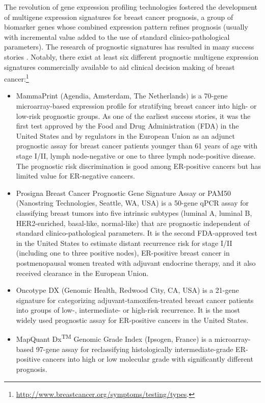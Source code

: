 The revolution of gene expression profiling technologies fostered the development of multigene expression signatures for breast cancer prognosis, a group of biomarker genes whose combined expression pattern refines prognosis (usually with incremental value added to the use of standard clinico-pathological parameters). The research of prognostic signatures has resulted in many success stories \cite{Sotiriou2009Gene}. Notably, there exist at least six different prognostic multigene expression signatures commercially available to aid clinical decision making of breast cancer:\footnote{\url{http://www.breastcancer.org/symptoms/testing/types}.}
\begin{itemize}
	\item MammaPrint\textsuperscript{\textregistered} (Agendia, Amsterdam, The Netherlands) \cite{Veer2002Gene} is a 70-gene microarray-based expression profile for stratifying breast cancer into high- or low-risk prognostic groups. As one of the earliest success stories, it was the first test approved by the Food and Drug Administration (FDA) in the United States and by regulators in the European Union as an adjunct prognostic assay for breast cancer patients younger than 61 years of age with stage I/II, lymph node-negative or one to three lymph node-positive disease. The prognostic risk discrimination is good among ER-positive cancers but has limited value for ER-negative cancers.
	\item Prosigna\textsuperscript{\textregistered} Breast Cancer Prognostic Gene Signature Assay or PAM50 (Nanostring Technologies, Seattle, WA, USA) \cite{Parker2009Supervised} is a 50-gene qPCR assay for classifying breast tumors into five intrinsic subtypes (luminal A, luminal B, HER2-enriched, basal-like, normal-like) that are prognostic independent of standard clinico-pathological parameters. It is the second FDA-approved test in the United States to estimate distant recurrence risk for stage I/II (including one to three positive nodes), ER-positive breast cancer in postmenopausal women treated with adjuvant endocrine therapy, and it also received clearance in the European Union.
	\item Oncotype DX\textsuperscript{\textregistered} (Genomic Health, Redwood City, CA, USA) \cite{Paik2004multigene} is a 21-gene signature for categorizing adjuvant-tamoxifen-treated breast cancer patients into groups of low-, intermediate- or high-risk recurrence. It is the most widely used prognostic assay for ER-positive cancers in the United States.
	\item MapQuant Dx\textsuperscript{TM} Genomic Grade Index (Ipsogen, France) \cite{Sotiriou2006Gene} is a microarray-based 97-gene assay for reclassifying histologically intermediate-grade ER-positive cancers into high or low molecular grade with significantly different prognosis.

\end{itemize}
